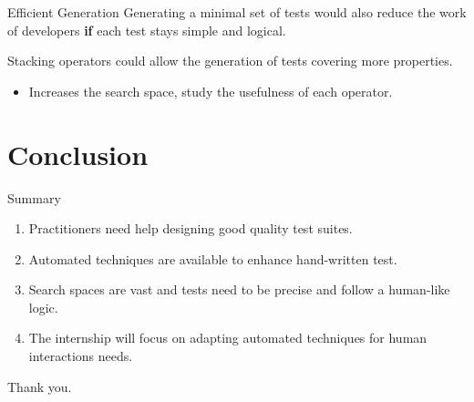 \documentclass{beamer}
\begin{document}
\begin{frame}{Efficient Generation}
  Generating a minimal set of tests would also reduce the work of developers \textbf{if} each test stays simple and logical.

  Stacking operators could allow the generation of tests covering more properties.
  \begin{itemize}
    \item Increases the search space, study the usefulness of each operator.
  \end{itemize}
\end{frame}


\section*{Conclusion}

\begin{frame}{Summary}
  \begin{enumerate}
    \item Practitioners need help designing good quality test suites.
    \item Automated techniques are available to enhance hand-written test.
    \item Search spaces are vast and tests need to be precise and follow a human-like logic.
    \item The internship will focus on adapting automated techniques for human interactions needs.
  \end{enumerate}
\end{frame}

\begin{frame}[standout]
  Thank you.
\end{frame}

\appendix
\end{document}
